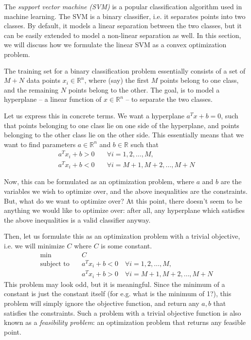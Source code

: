 \documentclass[a4paper]{article}
\theoremstyle{definition}
\begin{document}
The \textit{support vector machine (SVM)} is a popular classification algorithm used in machine learning.
The SVM is a binary classifier, i.e. it separates points into two classes.
By default, it models a linear separation between the two classes, but it can be easily extended to model a non-linear separation as well.
In this section, we will discuss how we formulate the linear SVM as a convex optimization problem.

The training set for a binary classification problem essentially consists of a set of $M + N$ data points $x_i \in \mathbb{R}^n$, where (say) the first $M$ points belong to one class, and the remaining $N$ points belong to the other.
The goal, is to model a hyperplane -- a linear function of $x \in \mathbb{R}^n$ -- to separate the two classes.

Let us express this in concrete terms.
We want a hyperplane $a^T x + b = 0$, such that points belonging to one class lie on one side of the hyperplane, and points belonging to the other class lie on the other side.
This essentially means that we want to find parameters $a \in \mathbb{R}^n$ and $b \in \mathbb{R}$ such that
\begin{align*}
	a^T x_i + b > 0 \quad & \forall i = 1, 2, \dots, M, \\
	a^T x_i + b < 0 \quad & \forall i = M{+}1, M{+}2, \dots, M{+}N
\end{align*}

Now, this can be formulated as an optimization problem, where $a$ and $b$ are the variables we wish to optimize over, and the above inequalities are the constraints.
But, what do we want to optimize over?
At this point, there doesn't seem to be anything we would like to optimize over: after all, any hyperplane which satisfies the above inequalities is a valid classifier anyway.

Then, let us formulate this as an optimization problem with a trivial objective, i.e. we will minimize $C$ where $C$ is some constant.
\begin{align*}
	\min \quad & C \\
	\text{subject to} \quad & a^T x_i + b < 0 \quad \forall i = 1, 2, \dots, M, \\
	& a^T x_i + b > 0 \quad \forall i = M{+}1, M{+}2, \dots, M{+}N
\end{align*}
This problem may look odd, but it is meaningful.
Since the minimum of a constant is just the constant itself (for e.g. what is the minimum of 1?), this problem will simply ignore the objective function, and return any $a, b$ that satisfies the constraints.
Such a problem with a trivial objective function is also known as a \textit{feasibility problem}: an optimization problem that returns any feasible point.
\end{document}
